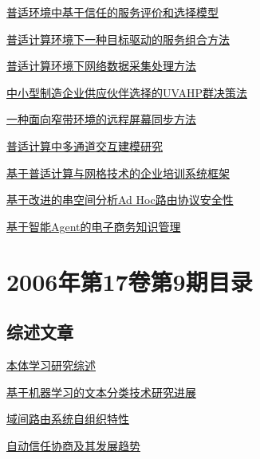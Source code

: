 \documentclass[a4paper]{article}
\begin{document}
\href{http://www.jos.org.cn/ch/reader/download_pdf.aspx?file_no=2006s125&year_id=2006&quarter_id=zk&falg=1}{普适环境中基于信任的服务评价和选择模型}

\href{http://www.jos.org.cn/ch/reader/download_pdf.aspx?file_no=2006s126&year_id=2006&quarter_id=zk&falg=1}{普适计算环境下一种目标驱动的服务组合方法}

\href{http://www.jos.org.cn/ch/reader/download_pdf.aspx?file_no=2006s127&year_id=2006&quarter_id=zk&falg=1}{普适计算环境下网络数据采集处理方法}

\href{http://www.jos.org.cn/ch/reader/download_pdf.aspx?file_no=2006s128&year_id=2006&quarter_id=zk&falg=1}{中小型制造企业供应伙伴选择的UVAHP群决策法}

\href{http://www.jos.org.cn/ch/reader/download_pdf.aspx?file_no=2006s129&year_id=2006&quarter_id=zk&falg=1}{一种面向窄带环境的远程屏幕同步方法}

\href{http://www.jos.org.cn/ch/reader/download_pdf.aspx?file_no=2006s130&year_id=2006&quarter_id=zk&falg=1}{普适计算中多通道交互建模研究}

\href{http://www.jos.org.cn/ch/reader/download_pdf.aspx?file_no=2006s131&year_id=2006&quarter_id=zk&falg=1}{基于普适计算与网格技术的企业培训系统框架}

\href{http://www.jos.org.cn/ch/reader/download_pdf.aspx?file_no=2006s132&year_id=2006&quarter_id=zk&falg=1}{基于改进的串空间分析Ad Hoc路由协议安全性}

\href{http://www.jos.org.cn/ch/reader/download_pdf.aspx?file_no=2006s133&year_id=2006&quarter_id=zk&falg=1}{基于智能Agent的电子商务知识管理}


\section{\textbf{2006年第17卷第9期目录}}
\subsection{综述文章}
\href{http://www.jos.org.cn/ch/reader/download_pdf.aspx?file_no=20060901&year_id=2006&quarter_id=9&falg=1}{本体学习研究综述}

\href{http://www.jos.org.cn/ch/reader/download_pdf.aspx?file_no=20060902&year_id=2006&quarter_id=9&falg=1}{基于机器学习的文本分类技术研究进展}

\href{http://www.jos.org.cn/ch/reader/download_pdf.aspx?file_no=20060911&year_id=2006&quarter_id=9&falg=1}{域间路由系统自组织特性}

\href{http://www.jos.org.cn/ch/reader/download_pdf.aspx?file_no=20060912&year_id=2006&quarter_id=9&falg=1}{自动信任协商及其发展趋势}
\end{document}
